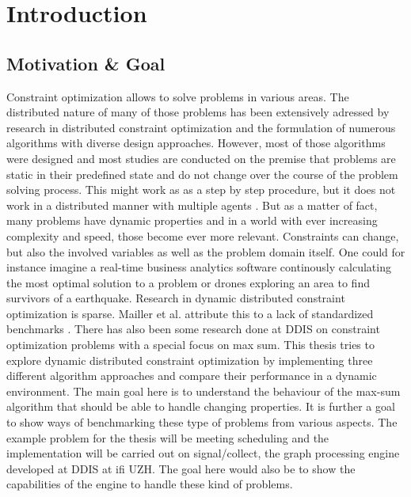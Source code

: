\chapter{Introduction}

\section{Motivation \& Goal}
Constraint optimization allows to solve problems in various areas. The distributed nature of  many of those problems has been extensively adressed by research in distributed constraint optimization and the formulation of numerous algorithms with diverse design approaches. However, most of those algorithms were designed and most studies are conducted on the premise that problems are static in their predefined state and do not change over the course of the problem solving process. This might work as as a step by step procedure, but it does not work in a distributed manner with multiple agents \cite{Petcu2007}. But as a matter of fact, many problems have dynamic properties and in a world with ever increasing complexity and speed, those become ever more relevant. Constraints can change, but also the involved variables as well as the problem domain itself. One could for instance imagine a real-time business analytics software continously calculating the most optimal solution to a problem or drones exploring an area to find survivors of a earthquake. Research in dynamic distributed constraint optimization is sparse. Mailler et al. attribute this to a lack of standardized benchmarks \cite{Mailler2014}. There has also been some research done at DDIS on constraint optimization problems with a special focus on max sum.
\newline \newline
This thesis tries to explore dynamic distributed constraint optimization by implementing three different algorithm approaches and compare their performance in a dynamic environment. The main goal here is to understand the behaviour of the max-sum algorithm that should be able to handle changing properties. It is further a goal to show ways of benchmarking these type of problems from various aspects. The example problem for the thesis will be meeting scheduling and the implementation will be carried out on signal/collect, the graph processing engine developed at  DDIS at ifi UZH. The goal here would also be to show the capabilities of the engine to handle these kind of problems. 


